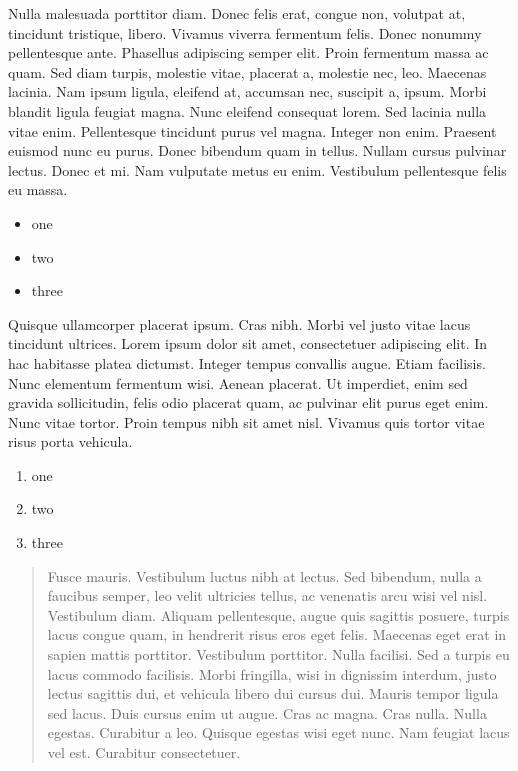 \documentclass{article}
\begin{document}
Nulla malesuada porttitor diam. Donec felis erat, congue non, volutpat at,
tincidunt tristique, libero. Vivamus viverra fermentum felis. Donec nonummy
pellentesque ante. Phasellus adipiscing semper elit. Proin fermentum massa ac
quam. Sed diam turpis, molestie vitae, placerat a, molestie nec, leo. Maecenas
lacinia. Nam ipsum ligula, eleifend at, accumsan nec, suscipit a, ipsum. Morbi
blandit ligula feugiat magna. Nunc eleifend consequat lorem. Sed lacinia nulla
vitae enim. Pellentesque tincidunt purus vel magna. Integer non enim. Praesent
euismod nunc eu purus. Donec bibendum quam in tellus. Nullam cursus pulvinar
lectus. Donec et mi. Nam vulputate metus eu enim. Vestibulum pellentesque felis
eu massa.

\begin{itemize}
	\item one
	\item two
	\item three
\end{itemize}

Quisque ullamcorper placerat ipsum. Cras nibh. Morbi vel justo vitae lacus
tincidunt ultrices. Lorem ipsum dolor sit amet, consectetuer adipiscing elit.
In hac habitasse platea dictumst. Integer tempus convallis augue. Etiam
facilisis. Nunc elementum fermentum wisi. Aenean placerat. Ut imperdiet, enim
sed gravida sollicitudin, felis odio placerat quam, ac pulvinar elit purus eget
enim.
Nunc vitae tortor. Proin tempus nibh sit amet nisl. Vivamus quis tortor vitae
risus porta vehicula.

\begin{enumerate}
	\item one
	\item two
	\item three
\end{enumerate}

\begin{quotation}
Fusce mauris. Vestibulum luctus nibh at lectus. Sed bibendum, nulla a
faucibus semper, leo velit ultricies tellus, ac venenatis arcu wisi vel nisl.
Vestibulum diam. Aliquam pellentesque, augue quis sagittis posuere, turpis
lacus congue quam, in hendrerit risus eros eget felis. Maecenas eget erat in
sapien mattis porttitor. Vestibulum porttitor. Nulla facilisi. Sed a turpis eu
lacus commodo facilisis. Morbi fringilla, wisi in dignissim interdum, justo
lectus sagittis dui, et vehicula libero dui cursus dui. Mauris tempor ligula
sed lacus. Duis cursus enim ut augue. Cras ac magna. Cras nulla. Nulla egestas.
Curabitur a leo. Quisque egestas wisi eget nunc. Nam feugiat lacus vel est.
Curabitur consectetuer.
\end{quotation}
\end{document}
